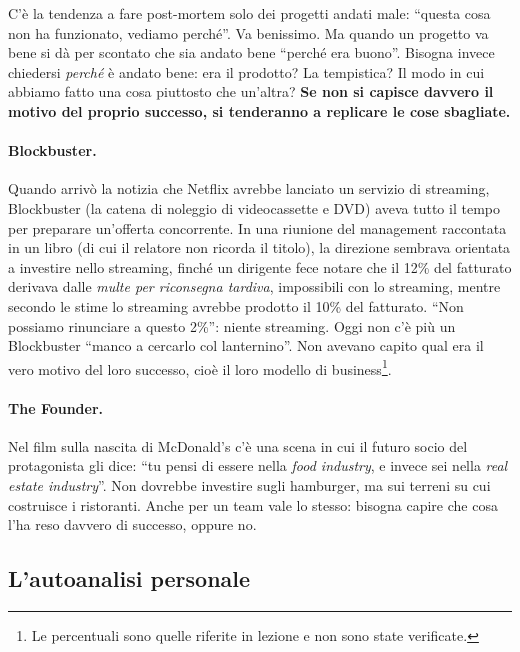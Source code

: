 C'è la tendenza a fare post-mortem solo dei progetti andati male: ``questa
cosa non ha funzionato, vediamo perché''. Va benissimo. Ma quando un progetto
va bene si dà per scontato che sia andato bene ``perché era buono''. Bisogna
invece chiedersi \emph{perché} è andato bene: era il prodotto? La
tempistica? Il modo in cui abbiamo fatto una cosa piuttosto che un'altra?
\textbf{Se non si capisce davvero il motivo del proprio successo, si
tenderanno a replicare le cose sbagliate.}

\paragraph{Blockbuster.} Quando arrivò la notizia che Netflix avrebbe
lanciato un servizio di streaming, Blockbuster (la catena di noleggio di
videocassette e DVD) aveva tutto il tempo per preparare un'offerta
concorrente. In una riunione del management raccontata in un libro (di cui il
relatore non ricorda il titolo), la direzione sembrava orientata a investire
nello streaming, finché un dirigente fece notare che il 12\% del fatturato
derivava dalle \emph{multe per riconsegna tardiva}, impossibili con lo
streaming, mentre secondo le stime lo streaming avrebbe prodotto il 10\% del
fatturato. ``Non possiamo rinunciare a questo 2\%'': niente streaming. Oggi
non c'è più un Blockbuster ``manco a cercarlo col lanternino''. Non avevano
capito qual era il vero motivo del loro successo, cioè il loro modello di
business\footnote{Le percentuali sono quelle riferite in lezione e non sono
state verificate.}.

\paragraph{The Founder.} Nel film sulla nascita di McDonald's c'è una scena in
cui il futuro socio del protagonista gli dice: ``tu pensi di essere nella
\emph{food industry}, e invece sei nella \emph{real estate industry}''. Non
dovrebbe investire sugli hamburger, ma sui terreni su cui costruisce i
ristoranti. Anche per un team vale lo stesso: bisogna capire che cosa
l'ha reso davvero di successo, oppure no.

\subsection{L'autoanalisi personale}

